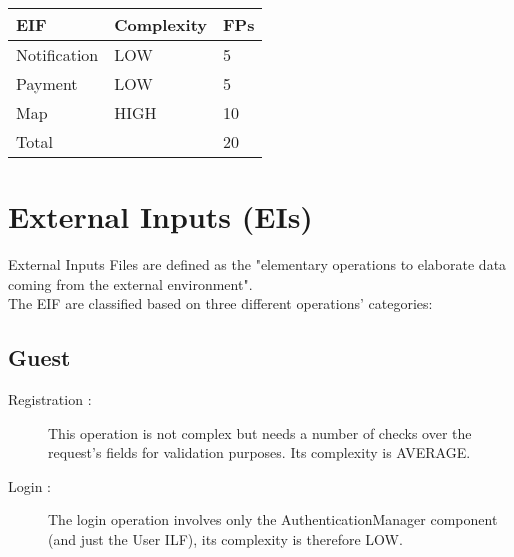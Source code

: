 \begin{center}
  \begin{tabular}{ |l|l|l| }
    \hline
    EIF & Complexity & FPs \\ \hline
    Notification & LOW & 5 \\ \hline
    Payment & LOW & 5 \\ \hline
    Map & HIGH & 10 \\ \hline
    \multicolumn{2}{|l|}{Total} & 20 \\ \hline
  \end{tabular}
\end{center}


\section{External Inputs (EIs)}
External Inputs Files are defined as the "elementary operations to elaborate data coming from the external environment".\\
The EIF are classified based on three different operations' categories:\\

\subsection{Guest}
\begin{description}
	\item [Registration :] This operation is not complex but needs a number of checks over the request's fields for validation purposes. Its complexity is AVERAGE.
	\item [Login :] The login operation involves only the AuthenticationManager component (and just the User ILF), its complexity is therefore LOW.
\end{description}

